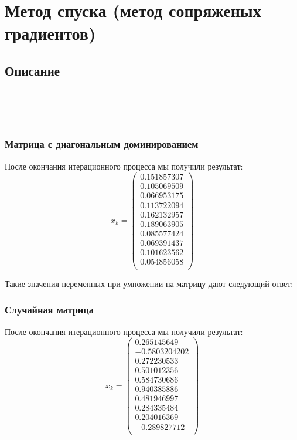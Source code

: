 \documentclass[../../report.tex]{subfiles}
\begin{document}
\chapter{Метод спуска (метод сопряженых градиентов)}

\section{Описание}
\\
\\
\\

\subsection{Матрица с диагональным доминированием}
После окончания итерационного процесса мы получили результат:
\[
x_{k} = 
\begin{pmatrix}
    0.151857307 \\
    0.105069509 \\
    0.066953175 \\
    0.113722094 \\
    0.162132957 \\
    0.189063905 \\
    0.085577424 \\
    0.069391437 \\
    0.101623562 \\
    0.054856058 \\
\end{pmatrix}
\]

Такие значения переменных при умножении на матрицу дают следующий ответ:


\subsection{Случайная матрица}
После окончания итерационного процесса мы получили результат:
\[
x_{k} = 
\begin{pmatrix}
    0.265145649 \\
  -0.5803204202 \\
    0.272230533 \\
    0.501012356 \\
    0.584730686 \\
    0.940385886 \\
    0.481946997 \\
    0.284335484 \\
    0.204016369 \\
   -0.289827712 \\
\end{pmatrix}
\]
\end{document}
